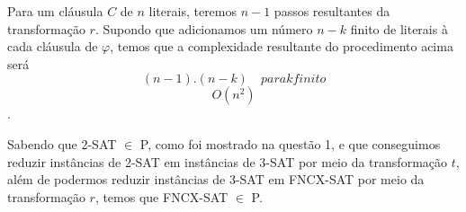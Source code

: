\documentclass[12pt]{article}
\begin{document}
\begin{enumerate}
{  Para um cláusula $C$ de $n$ literais, teremos $n-1$ passos resultantes da transformação $r$. Supondo que adicionamos um número $n-k$ finito de literais à cada cláusula de $\varphi$, temos que a complexidade resultante do procedimento acima será $$(n-1).(n-k) \quad para  k finito$$ $$O(n^2)$$.
  
  
  Sabendo que 2-SAT $\in$ P, como foi mostrado na questão 1, e que conseguimos reduzir instâncias de 2-SAT em instâncias de 3-SAT por meio da transformação $t$, além de podermos reduzir instâncias de 3-SAT em FNCX-SAT por meio da transformação $r$, temos que FNCX-SAT $\in$ P.
  }
\end{enumerate}
\end{document}
